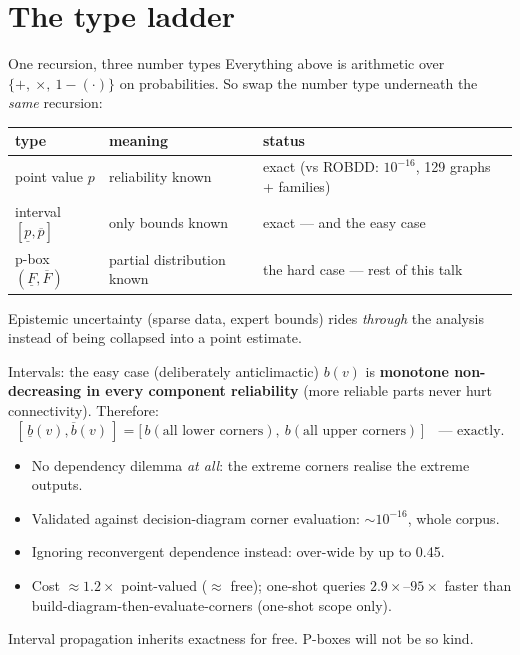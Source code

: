 \documentclass[aspectratio=169,11pt]{beamer}
\newcommand{\good}[1]{\textcolor{ipablue}{#1}}
\newcommand{\bad}[1]{\textcolor{ipared}{#1}}
\begin{document}
\section{The type ladder}

\begin{frame}{One recursion, three number types}
Everything above is arithmetic over $\{+,\ \times,\ 1-(\cdot)\}$ on probabilities.
So swap the number type underneath the \emph{same} recursion:
\medskip
\begin{center}
\begin{tabular}{lll}
\toprule
type & meaning & status\\
\midrule
point value $p$ & reliability known & exact (vs ROBDD: $10^{-16}$, 129 graphs + families)\\
interval $[\underline{p},\overline{p}]$ & only bounds known & \good{exact} --- and the easy case\\
p-box $(\underline{F},\overline{F})$ & partial distribution known & \bad{the hard case} --- rest of this talk\\
\bottomrule
\end{tabular}
\end{center}
\medskip
Epistemic uncertainty (sparse data, expert bounds) rides \emph{through} the analysis instead of being
collapsed into a point estimate.
\end{frame}

\begin{frame}{Intervals: the easy case (deliberately anticlimactic)}
$b(v)$ is \textbf{monotone non-decreasing in every component reliability} (more reliable parts never
hurt connectivity). Therefore:
\[
[\,\underline{b}(v),\overline{b}(v)\,]
=\bigl[\,b(\text{all lower corners}),\ b(\text{all upper corners})\,\bigr]
\quad\text{--- exactly.}
\]
\begin{itemize}
\item No dependency dilemma \emph{at all}: the extreme corners realise the extreme outputs.
\item Validated against decision-diagram corner evaluation: $\sim 10^{-16}$, whole corpus.
\item Ignoring reconvergent dependence instead: over-wide by up to \bad{0.45}.
\item Cost $\approx 1.2\times$ point-valued ($\approx$ free); one-shot queries $2.9\times$--$95\times$
  faster than build-diagram-then-evaluate-corners (one-shot scope only).
\end{itemize}
\medskip
\good{Interval propagation inherits exactness for free.}\quad
\bad{P-boxes will not be so kind.}
\end{frame}
\end{document}
